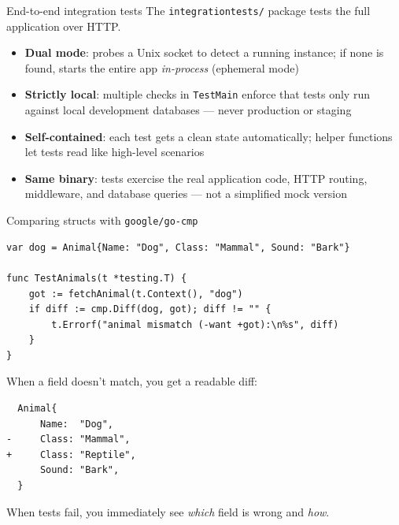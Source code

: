 \documentclass[aspectratio=169,11pt]{beamer}
\begin{document}
\begin{frame}{End-to-end integration tests}
  The \texttt{integrationtests/} package tests the full application over HTTP.

  \vspace{6pt}
  \begin{itemize}
    \setlength\itemsep{6pt}
    \item \textbf{Dual mode}: probes a Unix socket to detect a running instance;
          if none is found, starts the entire app \emph{in-process} (ephemeral mode)
    \item \textbf{Strictly local}: multiple checks in \texttt{TestMain} enforce that tests
          only run against local development databases --- never production or staging
    \item \textbf{Self-contained}: each test gets a clean state automatically;
          helper functions let tests read like high-level scenarios
    \item \textbf{Same binary}: tests exercise the real application code, HTTP routing,
          middleware, and database queries --- not a simplified mock version
  \end{itemize}
\end{frame}

\begin{frame}[fragile]{Comparing structs with \texttt{google/go-cmp}}
\begin{lstlisting}
var dog = Animal{Name: "Dog", Class: "Mammal", Sound: "Bark"}

func TestAnimals(t *testing.T) {
	got := fetchAnimal(t.Context(), "dog")
	if diff := cmp.Diff(dog, got); diff != "" {
		t.Errorf("animal mismatch (-want +got):\n%s", diff)
	}
}
\end{lstlisting}

  \vspace{4pt}
  When a field doesn't match, you get a readable diff:

\begin{lstlisting}
  Animal{
      Name:  "Dog",
-     Class: "Mammal",
+     Class: "Reptile",
      Sound: "Bark",
  }
\end{lstlisting}

  \vspace{4pt}
  {\small When tests fail, you immediately see \emph{which} field is wrong and \emph{how}.}
\end{frame}
\end{document}
